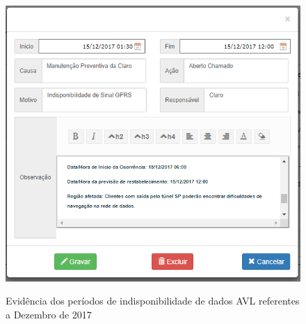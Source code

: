 \documentclass[
	12pt,				%
	oneside,			%
	a4paper,			%
	english,			%
	brazil				%
	]{abntex2ppgsi}
\begin{document}
\begin{figure}[!htb]%
	\centering
 	  \caption{Evidência dos períodos de indisponibilidade de dados AVL referentes a Dezembro de 2017}
		\includegraphics[width=0.5\linewidth]{images/33310_ANEXO_E_SIC_33310.png}
	\label{fig:e_sic_33310}
\end{figure}
\end{document}
